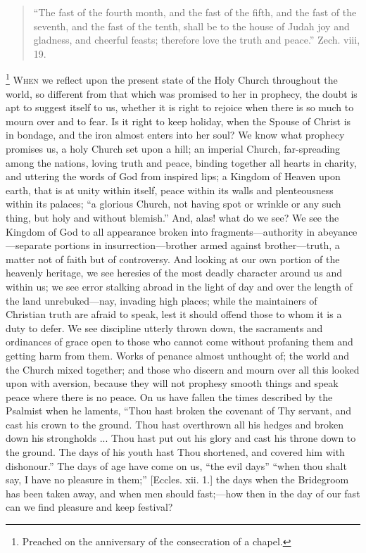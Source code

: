 
\begin{quote}

``The fast of the fourth month, and the fast of the fifth,
and the fast of the seventh, and the fast of the tenth, shall be to
the house of Judah joy and gladness, and cheerful feasts; therefore
love the truth and peace.'' Zech. viii, 19.

\end{quote}

\footnote{Preached on the anniversary of the consecration of a chapel.} W\textsc{hen} we reflect upon
the present state of the Holy Church throughout the world, so
different from that which was promised to her in prophecy, the doubt
is apt to suggest itself to us, whether it is right to rejoice when
there is so much to mourn over and to fear. Is it right to keep
holiday, when the Spouse of Christ is in bondage, and the iron almost
enters into her soul? We know what prophecy promises us, a holy Church
set upon a hill; an imperial Church, far-spreading among the nations,
loving truth and peace, binding together all hearts in charity, and
uttering the words of God from inspired lips; a Kingdom of Heaven upon
earth, that is at unity within itself, peace within its walls and
plenteousness within its palaces; ``a glorious Church, not having
spot or wrinkle or any such thing, but holy and without blemish.''
And, alas! what do we see? We see the Kingdom of God to all appearance
broken into fragments—authority in abeyance—separate portions in
insurrection—brother armed against brother—truth, a matter not of
faith but of controversy. And looking at our own portion of the
heavenly heritage, we see heresies of the most deadly character around
us and within us; we see error stalking abroad in the light of day and
over the length of the land unrebuked—nay, invading high places;
while the maintainers of Christian truth are afraid to speak, lest it
should offend those to whom it is a duty to defer. We see discipline
utterly thrown down, the sacraments and ordinances of grace open to
those who cannot come without profaning them and getting harm from
them. Works of penance almost unthought of; the world and the Church
mixed together; and those who discern and mourn over all this looked
upon with aversion, because they will not prophesy smooth things and
speak peace where there is no peace. On us have fallen the times
described by the Psalmist when he laments, ``Thou hast broken the
covenant of Thy servant, and cast his crown to the ground. Thou hast
overthrown all his hedges and broken down his strongholds ... Thou
hast put out his glory and cast his throne down to the ground. The
days of his youth hast Thou shortened, and covered him with dishonour.''
The days of age have come on us, ``the evil days'' ``when
thou shalt say, I have no pleasure in them;'' [Eccles. xii. 1.]
the days when the Bridegroom has been taken away, and when men should
fast;—how then in the day of our fast can we find pleasure and keep
festival?

